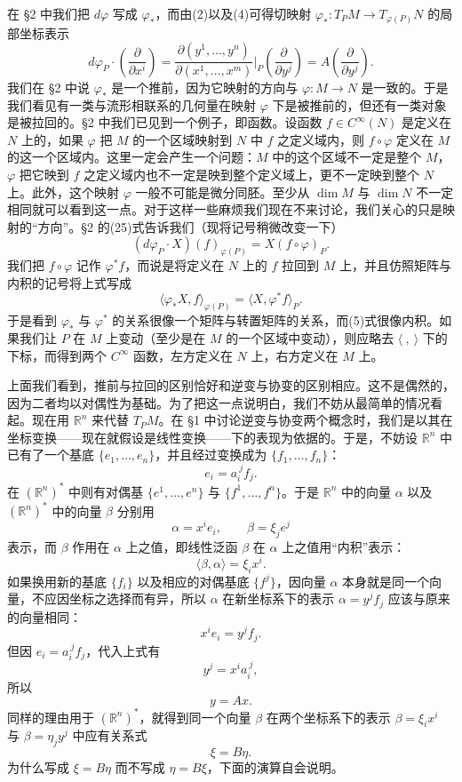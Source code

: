 在 §2 中我们把 $d\varphi$ 写成 $\varphi_*$，而由(2)以及(4)可得切映射 $\varphi_*:T_PM\to T_{\varphi(P)}N$ 的局部坐标表示
\[
 d\varphi_P\cdot\left(\frac{\partial}{\partial x^i}\right)
 =\frac{\partial(y^1,\ldots,y^n)}{\partial(x^1,\ldots,x^m)}\Big|_P
 \left(\frac{\partial}{\partial y^j}\right)
 =A\left(\frac{\partial}{\partial y^j}\right).
\]
我们在 §2 中说 $\varphi_*$ 是一个推前，因为它映射的方向与 $\varphi:M\to N$ 是一致的。于是我们看见有一类与流形相联系的几何量在映射 $\varphi$ 下是被推前的，但还有一类对象是被拉回的。§2 中我们已见到一个例子，即函数。设函数 $f\in C^\infty(N)$ 是定义在 $N$ 上的，如果 $\varphi$ 把 $M$ 的一个区域映射到 $N$ 中 $f$ 之定义域内，则 $f\circ\varphi$ 定义在 $M$ 的这一个区域内。这里一定会产生一个问题：$M$ 中的这个区域不一定是整个 $M$，$\varphi$ 把它映到 $f$ 之定义域内也不一定是映到整个定义域上，更不一定映到整个 $N$ 上。此外，这个映射 $\varphi$ 一般不可能是微分同胚。至少从 $\dim M$ 与 $\dim N$ 不一定相同就可以看到这一点。对于这样一些麻烦我们现在不来讨论，我们关心的只是映射的“方向”。§2 的(25)式告诉我们（现将记号稍微改变一下）
\[
 (d\varphi_P\cdot X)(f)_{\varphi(P)}=X(f\circ\varphi)_P.
\]
我们把 $f\circ\varphi$ 记作 $\varphi^*f$，而说是将定义在 $N$ 上的 $f$ 拉回到 $M$ 上，并且仿照矩阵与内积的记号将上式写成
\begin{equation}
 \langle\varphi_*X,f\rangle_{\varphi(P)}=\langle X,\varphi^*f\rangle_P.
 \tag{5}
\end{equation}
于是看到 $\varphi_*$ 与 $\varphi^*$ 的关系很像一个矩阵与转置矩阵的关系，而(5)式很像内积。如果我们让 $P$ 在 $M$ 上变动（至少是在 $M$ 的一个区域中变动），则应略去 $\langle\ ,\ \rangle$ 下的下标，而得到两个 $C^\infty$ 函数，左方定义在 $N$ 上，右方定义在 $M$ 上。

上面我们看到，推前与拉回的区别恰好和逆变与协变的区别相应。这不是偶然的，因为二者均以对偶性为基础。为了把这一点说明白，我们不妨从最简单的情况看起。现在用 $\mathbb R^n$ 来代替 $T_PM$。在 §1 中讨论逆变与协变两个概念时，我们是以其在坐标变换——现在就假设是线性变换——下的表现为依据的。于是，不妨设 $\mathbb R^n$ 中已有了一个基底 $\{e_1,\ldots,e_n\}$，并且经过变换成为 $\{f_1,\ldots,f_n\}$：
\[
 e_i=a_i^{\ j}f_j.
\]
在 $(\mathbb R^n)^*$ 中则有对偶基 $\{e^1,\ldots,e^n\}$ 与 $\{f^1,\ldots,f^n\}$。于是 $\mathbb R^n$ 中的向量 $\alpha$ 以及 $(\mathbb R^n)^*$ 中的向量 $\beta$ 分别用
\[
 \alpha=x^ie_i,\qquad \beta=\xi_j e^j
\]
表示，而 $\beta$ 作用在 $\alpha$ 上之值，即线性泛函 $\beta$ 在 $\alpha$ 上之值用“内积”表示：
\[
 \langle\beta,\alpha\rangle=\xi_ix^i.
\]
如果换用新的基底 $\{f_i\}$ 以及相应的对偶基底 $\{f^j\}$，因向量 $\alpha$ 本身就是同一个向量，不应因坐标之选择而有异，所以 $\alpha$ 在新坐标系下的表示 $\alpha=y^jf_j$ 应该与原来的向量相同：
\[
 x^ie_i=y^jf_j.
\]
但因 $e_i=a_i^{\ j}f_j$，代入上式有
\[
 y^j=x^ia_i^{\ j},
\]
所以
\[
 y=A x.
\]
同样的理由用于 $(\mathbb R^n)^*$，就得到同一个向量 $\beta$ 在两个坐标系下的表示 $\beta=\xi_ix^i$ 与 $\beta=\eta_j y^j$ 中应有关系式
\[
 \xi=B\eta.
\]
为什么写成 $\xi=B\eta$ 而不写成 $\eta=B\xi$，下面的演算自会说明。

